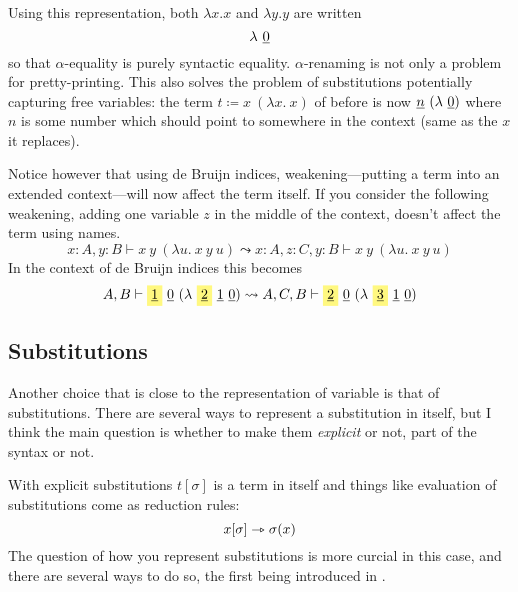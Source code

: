 Using this representation, both \(\lambda x.x\) and \(\lambda y.y\) are written
\[
  \lambda\ \underline{0}
\]
so that \(\alpha\)-equality is purely syntactic equality.
\(\alpha\)-renaming is not only a problem for pretty-printing.
This also solves the problem of substitutions potentially capturing free
variables: the term \(t \coloneqq x\ (\lambda x.\ x)\) of before is now
\(\db{n}\ (\lambda\ \db{0})\) where \(n\) is some number which should point to
somewhere in the context (same as the \(x\) it replaces).

Notice however that using de Bruijn indices, weakening---\ie putting a term into
an extended context---will now affect the term itself.
If you consider the following weakening, adding one variable \(z\) in the middle
of the context, doesn't affect the term using names.
\[
  x : A, y : B \vdash x\ y\ (\lambda u.\ x\ y\ u)
  \leadsto
  x : A, z : C, y : B \vdash x\ y\ (\lambda u.\ x\ y\ u)
\]
In the context of de Bruijn indices this becomes
\[
  A, B \vdash
  \highlight{\db{1}}\ \db{0}\ (\lambda\ \highlight{\db{2}}\ \db{1}\ \db{0})
  \leadsto
  A, C, B \vdash
  \highlight{\db{2}}\ \db{0}\ (\lambda\ \highlight{\db{3}}\ \db{1}\ \db{0})
\]


\subsection{Substitutions}

Another choice that is close to the representation of variable is that of
substitutions. There are several ways to represent a substitution in itself,
but I think the main question is whether to make them \emph{explicit} or not,
\ie part of the syntax or not.

With explicit substitutions \(t[\sigma]\) is a term in itself and things like
evaluation of substitutions come as reduction rules:
\[
  x[\sigma] \rightarrowtriangle \sigma(x)
\]
The question of how you represent substitutions is more curcial in this case,
and there are several ways to do so, the first being introduced in
.

